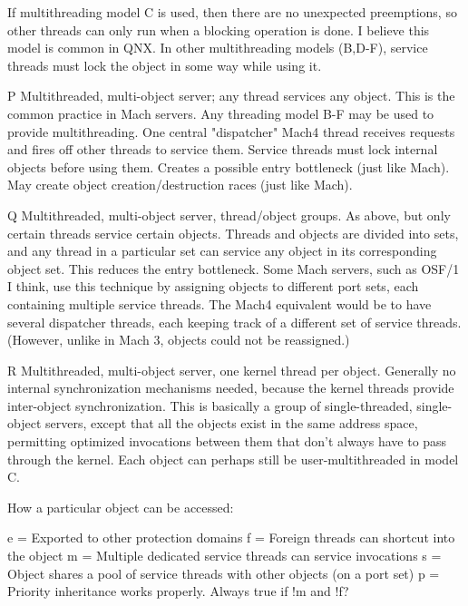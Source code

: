 {          If multithreading model C is used,
          then there are no unexpected preemptions,
          so other threads can only run when a blocking operation is done.
          I believe this model is common in QNX\@.
          In other multithreading models (B,D-F),
          service threads must lock the object in some way while using it.

        P Multithreaded, multi-object server; any thread services any object.
          This is the common practice in Mach servers.
          Any threading model B-F may be used to provide multithreading.
          One central "dispatcher" Mach4 thread receives requests
          and fires off other threads to service them.
          Service threads must lock internal objects before using them.
          Creates a possible entry bottleneck (just like Mach).
          May create object creation/destruction races (just like Mach).

        Q Multithreaded, multi-object server, thread/object groups.
          As above, but only certain threads service certain objects.
          Threads and objects are divided into sets,
          and any thread in a particular set
          can service any object in its corresponding object set.
          This reduces the entry bottleneck.
          Some Mach servers, such as OSF/1 I think,
          use this technique by assigning objects to different port sets,
          each containing multiple service threads.
          The Mach4 equivalent would be to have several dispatcher threads,
          each keeping track of a different set of service threads.
          (However, unlike in Mach 3, objects could not be reassigned.)

        R Multithreaded, multi-object server, one kernel thread per object.
          Generally no internal synchronization mechanisms needed,
          because the kernel threads provide inter-object synchronization.
          This is basically a group of single-threaded, single-object servers,
          except that all the objects exist in the same address space,
          permitting optimized invocations between them
          that don't always have to pass through the kernel.
          Each object can perhaps still be user-multithreaded in model C.


        How a particular object can be accessed:

                e = Exported to other protection domains
                f = Foreign threads can shortcut into the object
                m = Multiple dedicated service threads can service invocations
                s = Object shares a pool of service threads
                    with other objects (on a port set)
                p = Priority inheritance works properly.
                    Always true if !m and !f?

}
